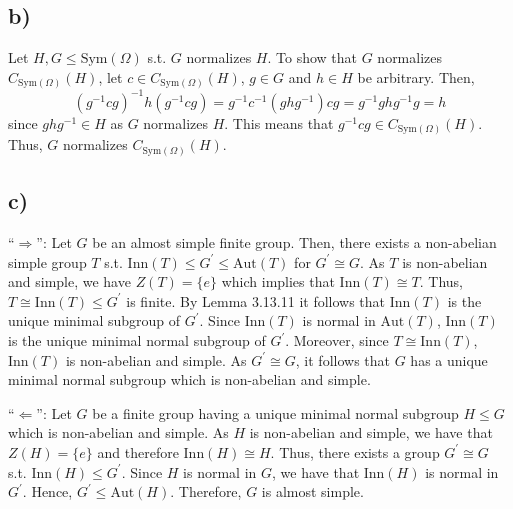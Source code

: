 \subsection*{b)}
Let $H,G \leq \text{Sym}(\Omega)$ s.t. $G$ normalizes $H$. To show that $G$ normalizes $C_{\text{Sym}(\Omega)}(H)$, let $c \in C_{\text{Sym}(\Omega)}(H)$, $g \in G$ and $h \in H$ be arbitrary. Then,
\[ (g^{-1}cg)^{-1}h(g^{-1}cg) = g^{-1}c^{-1}(ghg^{-1})cg = g^{-1}ghg^{-1}g = h \]
since $ghg^{-1} \in H$ as $G$ normalizes $H$. This means that $g^{-1}cg \in C_{\text{Sym}(\Omega)}(H)$. Thus, $G$ normalizes $C_{\text{Sym}(\Omega)}(H)$.

\subsection*{c)}
``$\Rightarrow$'': Let $G$ be an almost simple finite group. Then, there exists a non-abelian simple group $T$ s.t. $\text{Inn}(T) \leq G^\prime \leq \text{Aut}(T)$ for $G^\prime \cong G$. As $T$ is non-abelian and simple, we have $Z(T) = \{e\}$ which implies that $\text{Inn}(T) \cong T$. Thus, $T \cong \text{Inn}(T) \leq G^\prime$ is finite. By Lemma 3.13.11 it follows that $\text{Inn}(T)$ is the unique minimal subgroup of $G^\prime$. Since $\text{Inn}(T)$ is normal in $\text{Aut}(T)$, $\text{Inn}(T)$ is the unique minimal normal subgroup of $G^\prime$. 
Moreover, since $T \cong \text{Inn}(T)$, $\text{Inn}(T)$ is non-abelian and simple. As $G^\prime \cong G$, it follows that $G$ has a unique minimal normal subgroup which is non-abelian and simple.

``$\Leftarrow$'': Let $G$ be a finite group having a unique minimal normal subgroup $H \leq G$ which is non-abelian and simple. As $H$ is non-abelian and simple, we have that $Z(H) = \{e\}$ and therefore $\text{Inn}(H) \cong H$. Thus, there exists a group $G^\prime \cong G$ s.t. $\text{Inn}(H) \leq G^\prime$. Since $H$ is normal in $G$, we have that $\text{Inn}(H)$ is normal in $G^\prime$. Hence, $G^\prime \leq \text{Aut}(H)$. Therefore, $G$ is almost simple.
